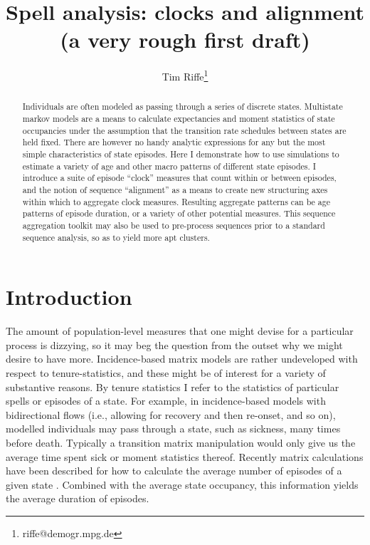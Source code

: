 \documentclass{article}
\begin{document}
\title{Spell analysis: clocks and alignment \\ (a very rough first draft)}
\author[1]{Tim Riffe\thanks{riffe@demogr.mpg.de}}
\maketitle

\begin{abstract}
Individuals are often modeled as passing through a series of discrete
states. Multistate markov models are a means to calculate expectancies and
moment statistics of state occupancies under the assumption that the transition
rate schedules between states are held fixed. There are however no handy
analytic expressions for any but the most simple characteristics of state episodes. Here
I demonstrate how to use simulations to estimate a variety of age and other
macro patterns of different state episodes. I introduce a
suite of episode ``clock'' measures that count within or between episodes, and the notion of
sequence ``alignment'' as a means to create new structuring axes within which to
aggregate clock measures. Resulting aggregate patterns can be age patterns of
episode duration, or a variety of other potential measures. This sequence
aggregation toolkit may also be used to pre-process sequences prior to a
standard sequence analysis, so as to yield more apt clusters. 
\end{abstract}

\section{Introduction}
The amount of population-level measures that one might devise for a particular
process is dizzying, so it may beg the question from the outset
why we might desire to have more. Incidence-based matrix
models are rather undeveloped with respect to tenure-statistics, and these
might be of interest for a variety of substantive reasons. By tenure statistics I
refer to the statistics of particular spells or episodes of a state. For
example, in incidence-based models with bidirectional flows (i.e., allowing for
recovery and then re-onset, and so on), modelled individuals may pass through a state,
such as sickness, many times before death. Typically a transition matrix
manipulation would only give us the average time spent sick or moment statistics
thereof. Recently matrix calculations have been described for how to calculate the average number of episodes of a given state \citep{dudel2017b}.
Combined with the average state occupancy, this information yields the average
duration of episodes.
\end{document}
